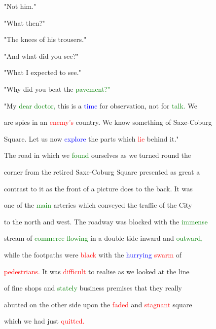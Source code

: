  "Not him."



 "What then?"



 "The knees of his trousers."



 "And what did you see?"



 "What I \textcolor{BurntOrange}{expected} to see."



 "Why did you beat the \textcolor{green}{pavement?"}



 "My \textcolor{green}{dear} \textcolor{green}{doctor,} this is a \textcolor{blue}{time} for observation, not for \textcolor{green}{talk.} We

 are spies in an \textcolor{red}{enemy's} country. We know something of Saxe-Coburg

 Square. Let us now \textcolor{blue}{explore} the parts which \textcolor{red}{lie} behind it."



 The road in which we \textcolor{green}{found} ourselves as we turned round the

 corner from the retired Saxe-Coburg Square \textcolor{BurntOrange}{presented} as great a

 contrast to it as the front of a picture does to the back. It was

 one of the \textcolor{green}{main} arteries which conveyed the traffic of the City

 to the north and west. The roadway was blocked with the \textcolor{green}{immense}

 stream of \textcolor{green}{commerce} \textcolor{green}{flowing} in a double tide inward and \textcolor{green}{outward,}

 while the footpaths were \textcolor{red}{black} with the \textcolor{blue}{hurrying} \textcolor{red}{swarm} of

 \textcolor{red}{pedestrians.} It was \textcolor{red}{difficult} to realise as we looked at the line

 of fine shops and \textcolor{green}{stately} business premises that they really

 abutted on the other side upon the \textcolor{red}{faded} and \textcolor{red}{stagnant} square

 which we had just \textcolor{red}{quitted.}



